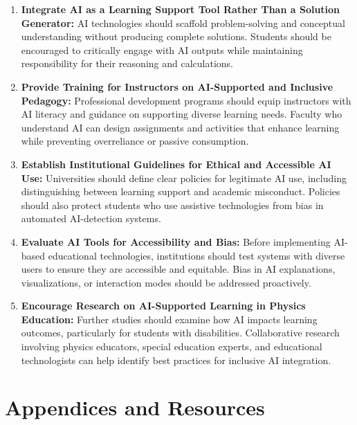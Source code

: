 \documentclass[]{aastex701}
\begin{document}
\begin{enumerate}
    \item \textbf{Integrate AI as a Learning Support Tool Rather Than a Solution Generator:} 
    AI technologies should scaffold problem-solving and conceptual understanding without producing complete solutions. Students should be encouraged to critically engage with AI outputs while maintaining responsibility for their reasoning and calculations.
    
    \item \textbf{Provide Training for Instructors on AI-Supported and Inclusive Pedagogy:} 
    Professional development programs should equip instructors with AI literacy and guidance on supporting diverse learning needs. Faculty who understand AI can design assignments and activities that enhance learning while preventing overreliance or passive consumption.
    
    \item \textbf{Establish Institutional Guidelines for Ethical and Accessible AI Use:} 
    Universities should define clear policies for legitimate AI use, including distinguishing between learning support and academic misconduct. Policies should also protect students who use assistive technologies from bias in automated AI-detection systems.
    
    \item \textbf{Evaluate AI Tools for Accessibility and Bias:} 
    Before implementing AI-based educational technologies, institutions should test systems with diverse users to ensure they are accessible and equitable. Bias in AI explanations, visualizations, or interaction modes should be addressed proactively.
    
    \item \textbf{Encourage Research on AI-Supported Learning in Physics Education:} 
    Further studies should examine how AI impacts learning outcomes, particularly for students with disabilities. Collaborative research involving physics educators, special education experts, and educational technologists can help identify best practices for inclusive AI integration.
\end{enumerate}






\appendix

\section{Appendices and Resources}

\end{document}
